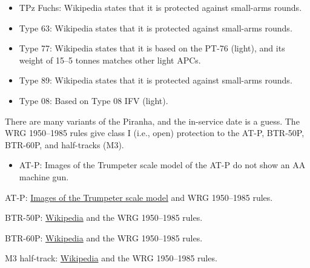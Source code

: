 \begin{withcounters}
{\begin{itemize}
            \item TPz Fuchs: Wikipedia states that it is protected against small-arms rounds.
            \item Type 63: Wikipedia states that it is protected against small-arms rounds.
            \item Type 77: Wikipedia states that it is based on the PT-76 (light), and its weight of 15--5 tonnes matches other light APCs.
            \item Type 89: Wikipedia states that it is protected against small-arms rounds.
            \item Type 08: Based on Type 08 IFV (light).
        \end{itemize}

        There are many variants of the Piranha, and the in-service date is a guess.
        The WRG 1950--1985 rules give class I (i.e., open) protection to the
        AT-P,
        BTR-50P,
        BTR-60P,
        and
        half-tracks (M3).
        \begin{itemize}
            \item AT-P: Images of the Trumpeter scale model of the AT-P do not show an AA machine gun.
        \end{itemize}

        \begin{notesources}
            \item AT-P: \href{https://www.super-hobby.com/products/Soviet-AT-P-artillery-tractor.html}{Images of the Trumpeter scale model} and WRG 1950--1985 rules.
            \item BTR-50P: \href{https://en.wikipedia.org/wiki/BTR-50}{Wikipedia} and the WRG 1950--1985 rules.
            \item BTR-60P: \href{https://en.wikipedia.org/wiki/BTR-60}{Wikipedia} and the WRG 1950--1985 rules.
            \item M3 half-track: \href{https://en.wikipedia.org/wiki/M3_half-track}{Wikipedia} and the WRG 1950--1985 rules.
        \end{notesources}
    }\\
    \\
    \\
    \\


\end{withcounters}
